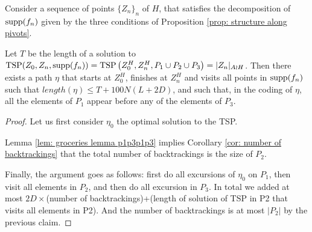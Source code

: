 \begin{lem}
	Consider a sequence of points $\{Z_n\}_n$ of $H$, that satisfies the decomposition of $\mathrm{supp}(f_n)$ given by the three conditions of Proposition \ref{prop: structure along pivots}.
	
	Let $T$ be the length of a solution to $\mathrm{TSP}(Z_0,Z_n,\mathrm{supp}(f_n))=\mathrm{TSP}\left(Z^H_0,Z^H_n,P_1\cup P_2\cup P_3\right)=|Z_n|_{A \wr H}$. Then there exists a path $\eta$ that starts at $Z^H_0$, finishes at $Z^H_n$ and visits all points in $\mathrm{supp}(f_n)$ such that $length(\eta)\le T+100 N (L+2D)$, and such that, in the coding of $\eta$, all the elements of $P_1$ appear before any of the elements of $P_3$.
	
\end{lem}
\begin{proof}
	
	Let us first consider $\eta_0$ the optimal solution to the TSP. 
	
	
	Lemma \ref{lem: groceries lemma p1p3p1p3} implies Corollary \ref{cor: number of backtrackings} that the total number of backtrackings is the size of $P_2$.
	
	Finally, the argument goes as follows: first do all excursions of $\eta_0$ on $P_1$, then visit all elements in $P_2$, and then do all excursion in $P_3$. In total we added at most $2D\times$(number of backtrackings)+(length of solution of TSP in P2 that visits all elements in P2). And the number of backtrackings is at most $|P_2|$ by the previous claim.
	
\end{proof}
